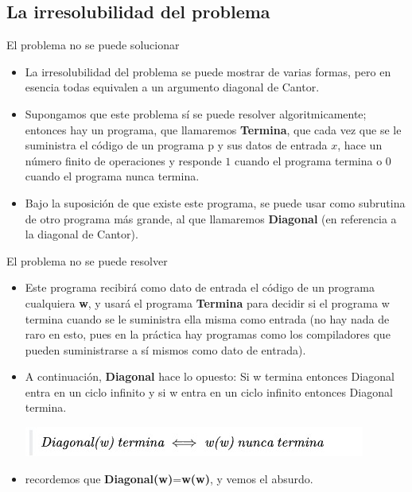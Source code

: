 \documentclass{beamer}
\begin{document}
\subsection{La irresolubilidad del problema}
\begin{frame}{El problema no se puede solucionar}
\begin{itemize}
    \item La irresolubilidad del problema se puede mostrar de varias formas, pero en esencia todas equivalen a un argumento diagonal de Cantor.\pause
    \item Supongamos que este problema sí se puede resolver algoritmicamente; entonces hay un programa, que llamaremos \textbf{Termina}, que cada vez que se le suministra el código de un programa p y sus datos de entrada $x$, hace un número finito de operaciones y responde $1$ cuando el programa termina o $0$ cuando el programa nunca termina.\pause
    \item Bajo la suposición de que existe este programa, se puede usar como subrutina de otro programa más grande, al que llamaremos \textbf{Diagonal} (en referencia a la diagonal de Cantor). 
\end{itemize}
\end{frame}
\begin{frame}{El problema no se puede resolver}
    \begin{itemize}
        \item Este programa recibirá como dato de entrada el código de un programa cualquiera \textbf{w}, y usará el programa \textbf{Termina} para decidir si el programa w termina cuando se le suministra ella misma como entrada (no hay nada de raro en esto, pues en la práctica hay programas como los compiladores que pueden suministrarse a sí mismos como dato de entrada).\pause
        \item A continuación, \textbf{Diagonal} hace lo opuesto: Si w termina entonces Diagonal entra en un ciclo infinito y si w entra en un ciclo infinito entonces Diagonal termina.\pause
        \begin{center}
            \includegraphics[scale=0.5]{diagrama.png}
        \end{center}
        \item recordemos que \textbf{Diagonal(w)}=\textbf{w(w)}, y vemos el absurdo.
    \end{itemize}
\end{frame}
\end{document}
